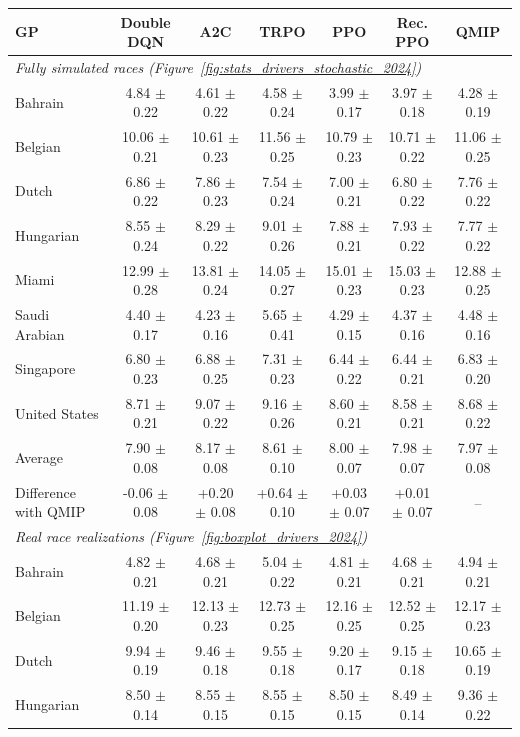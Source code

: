 \begin{tabular}{lcccccc}
\toprule
GP & Double DQN & A2C & TRPO & PPO & Rec. PPO & QMIP \\
\midrule
\multicolumn{7}{l}{\textit{Fully simulated races (Figure~\ref{fig:stats_drivers_stochastic_2024})}} \\
\midrule
Bahrain & 4.84 $\pm$ 0.22 & 4.61 $\pm$ 0.22 & 4.58 $\pm$ 0.24 & 3.99 $\pm$ 0.17 & 3.97 $\pm$ 0.18 & 4.28 $\pm$ 0.19 \\
Belgian & 10.06 $\pm$ 0.21 & 10.61 $\pm$ 0.23 & 11.56 $\pm$ 0.25 & 10.79 $\pm$ 0.23 & 10.71 $\pm$ 0.22 & 11.06 $\pm$ 0.25 \\
Dutch & 6.86 $\pm$ 0.22 & 7.86 $\pm$ 0.23 & 7.54 $\pm$ 0.24 & 7.00 $\pm$ 0.21 & 6.80 $\pm$ 0.22 & 7.76 $\pm$ 0.22 \\
Hungarian & 8.55 $\pm$ 0.24 & 8.29 $\pm$ 0.22 & 9.01 $\pm$ 0.26 & 7.88 $\pm$ 0.21 & 7.93 $\pm$ 0.22 & 7.77 $\pm$ 0.22 \\
Miami & 12.99 $\pm$ 0.28 & 13.81 $\pm$ 0.24 & 14.05 $\pm$ 0.27 & 15.01 $\pm$ 0.23 & 15.03 $\pm$ 0.23 & 12.88 $\pm$ 0.25 \\
Saudi Arabian & 4.40 $\pm$ 0.17 & 4.23 $\pm$ 0.16 & 5.65 $\pm$ 0.41 & 4.29 $\pm$ 0.15 & 4.37 $\pm$ 0.16 & 4.48 $\pm$ 0.16 \\
Singapore & 6.80 $\pm$ 0.23 & 6.88 $\pm$ 0.25 & 7.31 $\pm$ 0.23 & 6.44 $\pm$ 0.22 & 6.44 $\pm$ 0.21 & 6.83 $\pm$ 0.20 \\
United States & 8.71 $\pm$ 0.21 & 9.07 $\pm$ 0.22 & 9.16 $\pm$ 0.26 & 8.60 $\pm$ 0.21 & 8.58 $\pm$ 0.21 & 8.68 $\pm$ 0.22 \\
\midrule
Average & 7.90 $\pm$ 0.08 & 8.17 $\pm$ 0.08 & 8.61 $\pm$ 0.10 & 8.00 $\pm$ 0.07 & 7.98 $\pm$ 0.07 & 7.97 $\pm$ 0.08 \\
Difference with QMIP & -0.06 $\pm$ 0.08 & +0.20 $\pm$ 0.08 & +0.64 $\pm$ 0.10 & +0.03 $\pm$ 0.07 & +0.01 $\pm$ 0.07 & -- \\
\midrule
\multicolumn{7}{l}{\textit{Real race realizations (Figure~\ref{fig:boxplot_drivers_2024})}} \\
\midrule
Bahrain & 4.82 $\pm$ 0.21 & 4.68 $\pm$ 0.21 & 5.04 $\pm$ 0.22 & 4.81 $\pm$ 0.21 & 4.68 $\pm$ 0.21 & 4.94 $\pm$ 0.21 \\
Belgian & 11.19 $\pm$ 0.20 & 12.13 $\pm$ 0.23 & 12.73 $\pm$ 0.25 & 12.16 $\pm$ 0.25 & 12.52 $\pm$ 0.25 & 12.17 $\pm$ 0.23 \\
Dutch & 9.94 $\pm$ 0.19 & 9.46 $\pm$ 0.18 & 9.55 $\pm$ 0.18 & 9.20 $\pm$ 0.17 & 9.15 $\pm$ 0.18 & 10.65 $\pm$ 0.19 \\
Hungarian & 8.50 $\pm$ 0.14 & 8.55 $\pm$ 0.15 & 8.55 $\pm$ 0.15 & 8.50 $\pm$ 0.15 & 8.49 $\pm$ 0.14 & 9.36 $\pm$ 0.22 \\

\end{tabular}
